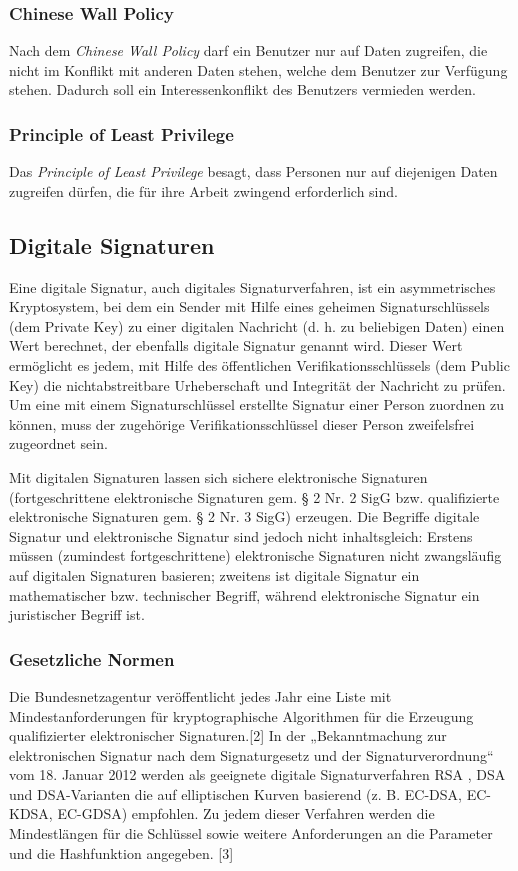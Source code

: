 \subsubsection{Chinese Wall Policy}
Nach dem \textit{Chinese Wall Policy} darf ein Benutzer nur auf Daten zugreifen, die nicht im Konflikt mit anderen Daten stehen, welche dem Benutzer zur Verfügung stehen. Dadurch soll ein Interessenkonflikt des Benutzers vermieden werden. 
\subsubsection{Principle of Least Privilege}
Das \textit{Principle of Least Privilege} besagt, dass Personen nur auf diejenigen Daten zugreifen dürfen, die für ihre Arbeit zwingend erforderlich sind.
\subsection*{Digitale Signaturen}
Eine digitale Signatur, auch digitales Signaturverfahren, ist ein asymmetrisches Kryptosystem, bei dem ein Sender mit Hilfe eines geheimen Signaturschlüssels (dem Private Key) zu einer digitalen Nachricht (d. h. zu beliebigen Daten) einen Wert berechnet, der ebenfalls digitale Signatur genannt wird. Dieser Wert ermöglicht es jedem, mit Hilfe des öffentlichen Verifikationsschlüssels (dem Public Key) die nichtabstreitbare Urheberschaft und Integrität der Nachricht zu prüfen. Um eine mit einem Signaturschlüssel erstellte Signatur einer Person zuordnen zu können, muss der zugehörige Verifikationsschlüssel dieser Person zweifelsfrei zugeordnet sein.

Mit digitalen Signaturen lassen sich sichere elektronische Signaturen (fortgeschrittene elektronische Signaturen gem. § 2 Nr. 2 SigG bzw. qualifizierte elektronische Signaturen gem. § 2 Nr. 3 SigG) erzeugen. Die Begriffe digitale Signatur und elektronische Signatur sind jedoch nicht inhaltsgleich: Erstens müssen (zumindest fortgeschrittene) elektronische Signaturen nicht zwangsläufig auf digitalen Signaturen basieren; zweitens ist digitale Signatur ein mathematischer bzw. technischer Begriff, während elektronische Signatur ein juristischer Begriff ist.
\subsubsection{Gesetzliche Normen}
Die Bundesnetzagentur veröffentlicht jedes Jahr eine Liste mit Mindestanforderungen für kryptographische Algorithmen für die Erzeugung qualifizierter elektronischer Signaturen.[2] In der „Bekanntmachung zur elektronischen Signatur nach dem Signaturgesetz und der Signaturverordnung“ vom 18. Januar 2012 werden als geeignete digitale Signaturverfahren RSA , DSA und DSA-Varianten die auf elliptischen Kurven basierend (z. B. EC-DSA, EC-KDSA, EC-GDSA) empfohlen. Zu jedem dieser Verfahren werden die Mindestlängen für die Schlüssel sowie weitere Anforderungen an die Parameter und die Hashfunktion angegeben. [3]
